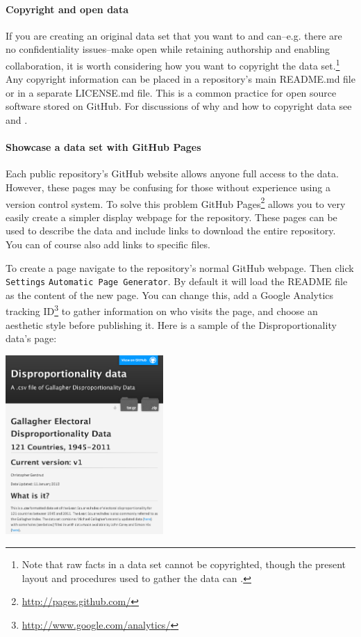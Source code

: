 \documentclass[twocolumn]{article}\usepackage{graphicx, color}
\begin{document}
\paragraph{Copyright and open data}

If you are creating an original data set that you want to and can--e.g. there are no confidentiality issues--make open while retaining authorship and enabling collaboration, it is worth considering how you want to copyright the data set.\footnote{Note that raw facts in a data set cannot be copyrighted, though the present layout and procedures used to gather the data can \citep[39]{Stodden2009}.} Any copyright information can be placed in a repository's main README.md file or in a separate LICENSE.md file. This is a common practice for open source software stored on GitHub. For discussions of why and how to copyright data see \cite{Stodden2009} and \cite{CreativeCommons}.

\paragraph{Showcase a data set with GitHub Pages}

Each public repository's GitHub website allows anyone full access to the data. However, these pages may be confusing for those without experience using a version control system. To solve this problem GitHub Pages\footnote{\url{http://pages.github.com/}} allows you to very easily create a simpler display webpage for the repository. These pages can be used to describe the data and include links to download the entire repository. You can of course also add links to specific files.

To create a page navigate to the repository's normal GitHub webpage. Then click \texttt{Settings} \textrightarrow{} \texttt{Automatic Page Generator}. By default it will load the README file as the content of the new page. You can change this, add a Google Analytics tracking ID\footnote{\url{http://www.google.com/analytics/}} to gather information on who visits the page, and choose an aesthetic style before publishing it. Here is a sample of the Disproportionality data's page:

\begin{center}
	\includegraphics[width=0.45\textwidth]{images/Pages.png}
\end{center}
\end{document}
